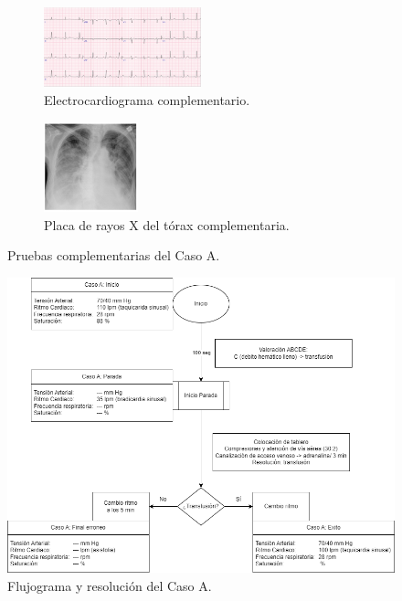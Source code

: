 \begin{figure}[hptb]
    \centering
    \begin{subfigure}{.5\textwidth}
      \centering
      \includegraphics[width=0.5\textwidth]{./imagenes/UCIDoc-SVICasoAECG.png}
      \caption{\label{fig:Brusilov:SVI:CasoAECG}Electrocardiograma complementario.}
    \end{subfigure}%
    \begin{subfigure}{.5\textwidth}
      \centering
      \includegraphics[width=0.3\textwidth]{./imagenes/UCIDoc-SVICasoARXTorax.png}
      \caption{\label{fig:Brusilov:SVI:CasoARXTorax}Placa de rayos X del tórax complementaria.}
    \end{subfigure}
    \caption{\label{fig:Brusilov:SVI:CasoA}Pruebas complementarias del Caso A.}
\end{figure}

\begin{figure}[hptb]
    \centering
	\includegraphics[width=0.766\linewidth]{./imagenes/ACV-AdSC-CasosUCI_CasoA.png}
	\caption{\label{fig:Brusilov:SVI:CasoA}Flujograma y resolución del Caso A.}
\end{figure}
\clearpage

